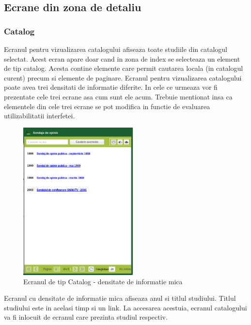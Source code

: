 \subsection{Ecrane din zona de detaliu}
\subsubsection{Catalog}

Ecranul pentru vizualizarea catalogului afiseaza toate studiile din
catalogul selectat. Acest ecran apare doar cand in zona de index se
selecteaza un element de tip catalog. Acesta contine elemente care
permit cautarea locala (in catalogul curent) precum si elemente de
paginare. Ecranul pentru vizualizarea catalogului poate avea trei
densitati de informatie diferite. In cele ce urmeaza vor fi prezentate
cele trei ecrane asa cum sunt ele acum. Trebuie mentionat insa ca
elementele din cele trei ecrane se pot modifica in functie de evaluarea
utilizabilitatii interfetei.

\begin{figure}[H]
\begin{centering}
\includegraphics[width=6cm]{screenshots/details-panel-catalog-simple}
\par\end{centering}
\caption{Ecranul de tip Catalog - densitate de informatie mica}
\end{figure}

Ecranul cu densitate de informatie mica afiseaza anul si titlul studiului.
Titlul studiului este in acelasi timp si un link. La accesarea acestuia,
ecranul catalogului va fi inlocuit de ecranul care prezinta studiul
respectiv. 

